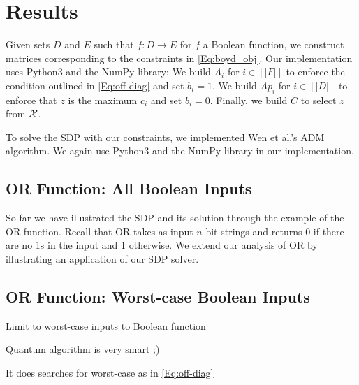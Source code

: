 \section{Results}

Given sets $D$ and $E$ such that
$f : D \rightarrow E$ for $f$ a Boolean function,
we construct matrices corresponding to the constraints
in \cref{Eq:boyd_obj}.
Our implementation uses Python3 and the NumPy library:
We build $A_i$ for $i \in [|F|]$ to enforce the condition
outlined in \cref{Eq:off-diag} and set $b_i=1$.
We build $Ap_i$ for $i \in [|D|]$ to enforce
that $z$ is the maximum $c_i$ and set $b_i = 0$.
Finally, we build $C$ to select $z$ from $\operatorname{\mathcal{X}}$.

To solve the SDP with our constraints,
we implemented Wen et al.'s ADM algorithm.
We again use Python3 and the NumPy library
in our implementation.

\subsection{OR Function: All Boolean Inputs}

So far we have illustrated the SDP and its solution
through the example of the OR function.
Recall that OR takes as input $n$ bit strings
and returns 0 if there are no 1s in the input
and 1 otherwise.
We extend our analysis of OR by illustrating
an application of our SDP solver.

\subsection{OR Function: Worst-case Boolean Inputs}\label{sec:speed}

Limit to worst-case inputs to Boolean function

Quantum algorithm is very smart ;)

It does searches for worst-case as in \cref{Eq:off-diag}